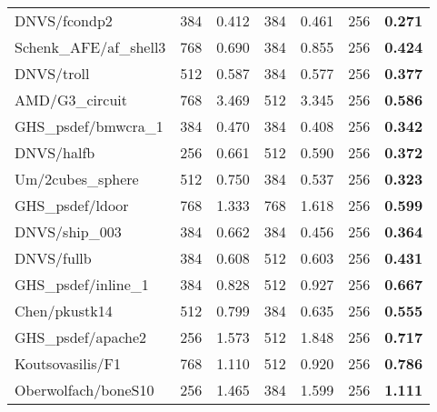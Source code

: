 \begin{tabular}{l|rr|rr|rr}
  DNVS/fcondp2                    & 384                              & 0.412                      & 384  & 0.461     & 256 & \bf 0.271  \\
  Schenk\_AFE/af\_shell3          & 768                              & 0.690                      & 384  & 0.855     & 256 & \bf 0.424  \\
  DNVS/troll                      & 512                              & 0.587                      & 384  & 0.577     & 256 & \bf 0.377  \\
  AMD/G3\_circuit                 & 768                              & 3.469                      & 512  & 3.345     & 256 & \bf 0.586  \\
  GHS\_psdef/bmwcra\_1            & 384                              & 0.470                      & 384  & 0.408     & 256 & \bf 0.342  \\
  DNVS/halfb                      & 256                              & 0.661                      & 512  & 0.590     & 256 & \bf 0.372  \\
  Um/2cubes\_sphere               & 512                              & 0.750                      & 384  & 0.537     & 256 & \bf 0.323  \\
  GHS\_psdef/ldoor                & 768                              & 1.333                      & 768  & 1.618     & 256 & \bf 0.599  \\
  DNVS/ship\_003                  & 384                              & 0.662                      & 384  & 0.456     & 256 & \bf 0.364  \\
  DNVS/fullb                      & 384                              & 0.608                      & 512  & 0.603     & 256 & \bf 0.431  \\
  GHS\_psdef/inline\_1            & 384                              & 0.828                      & 512  & 0.927     & 256 & \bf 0.667  \\
  Chen/pkustk14                   & 512                              & 0.799                      & 384  & 0.635     & 256 & \bf 0.555  \\
  GHS\_psdef/apache2              & 256                              & 1.573                      & 512  & 1.848     & 256 & \bf 0.717  \\
  Koutsovasilis/F1                & 768                              & 1.110                      & 512  & 0.920     & 256 & \bf 0.786  \\
  Oberwolfach/boneS10             & 256                              & 1.465                      & 384  & 1.599     & 256 & \bf 1.111  \\

\end{tabular}
